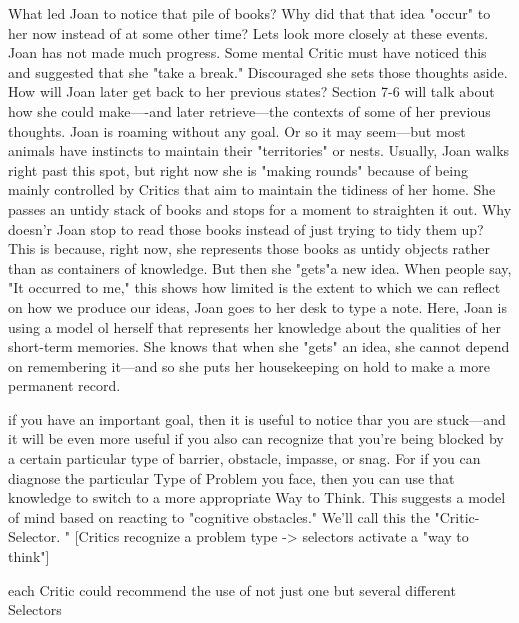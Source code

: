 \documentclass[10pt,a4paper]{article}
\begin{document}
What led Joan to notice that pile of books? Why did that that idea "occur" to her now instead of at some other time? Lets look more closely at these events.
Joan has not made much progress. Some mental Critic must have
noticed this and suggested that she "take a break."
Discouraged she sets those thoughts aside. How will Joan later get back to her previous states? Section 7-6 will talk about how she could make—-and later retrieve—the contexts of some of her
previous thoughts.
Joan is roaming without any goal. Or so it may seem—but most animals have instincts to maintain their "territories" or nests. Usually, Joan walks right past this spot, but right now she is "making rounds" because of being mainly controlled by Critics that aim to maintain the tidiness of her home.
She passes an untidy stack of books and stops for a moment to straighten it out. Why doesn'r Joan stop to read those books instead of just trying to tidy them up? This is because, right now, she represents those books as untidy objects rather than as containers of knowledge.
But then she "gets"a new idea. When people say, "It occurred to me," this shows how limited is the extent to which we can reflect on how we produce our ideas,
Joan goes to her desk to type a note. Here, Joan is using a model ol herself that represents her knowledge about the qualities of her short-term memories. She knows that when she "gets" an idea, she cannot depend on remembering it—and so she puts her housekeeping on hold to make a more permanent record. \cite[p.~219]{minsky}

if you have an important goal, then it is useful to notice thar you are stuck—and it will be even more useful if you also can recognize that you're being blocked by a certain particular type of barrier, obstacle, impasse, or snag. For if you can diagnose the particular Type of Problem you face, then you can use that knowledge to switch to a more appropriate Way to Think. This suggests a model of mind based on reacting to "cognitive obstacles." We'll call this the "Critic-Selector. "
[Critics recognize a problem type -> selectors activate a "way to think"] \cite[p.~220]{minsky}

each Critic could recommend the use of not just one but several different Selectors \cite[p.~222]{minsky}
\end{document}
